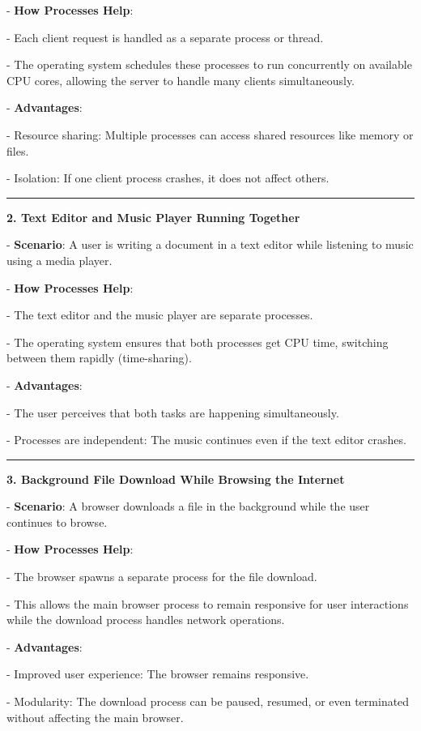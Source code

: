 \documentclass[a4paper]{book}
\begin{document}
   - \textbf{How Processes Help}:
     
     - Each client request is handled as a separate process or thread. 
     
     - The operating system schedules these processes to run concurrently on available CPU cores, allowing the server to handle many clients simultaneously.
   
   - \textbf{Advantages}:
     
     - Resource sharing: Multiple processes can access shared resources like memory or files.
     
     - Isolation: If one client process crashes, it does not affect others.

\rule{0.75\textwidth}{0.5pt}

\textbf{2. Text Editor and Music Player Running Together}

   - \textbf{Scenario}: A user is writing a document in a text editor while listening to music using a media player.
  
   - \textbf{How Processes Help}:

     - The text editor and the music player are separate processes.

     - The operating system ensures that both processes get CPU time, switching between them rapidly (time-sharing).

   - \textbf{Advantages}:

     - The user perceives that both tasks are happening simultaneously.

     - Processes are independent: The music continues even if the text editor crashes.

\rule{0.75\textwidth}{0.5pt}

\textbf{3. Background File Download While Browsing the Internet}

   - \textbf{Scenario}: A browser downloads a file in the background while the user continues to browse.
   
   - \textbf{How Processes Help}:
     
     - The browser spawns a separate process for the file download.
     
     - This allows the main browser process to remain responsive for user interactions while the download process handles network operations.
   
   - \textbf{Advantages}:
     
     - Improved user experience: The browser remains responsive.
     
     - Modularity: The download process can be paused, resumed, or even terminated without affecting the main browser.
\end{document}
